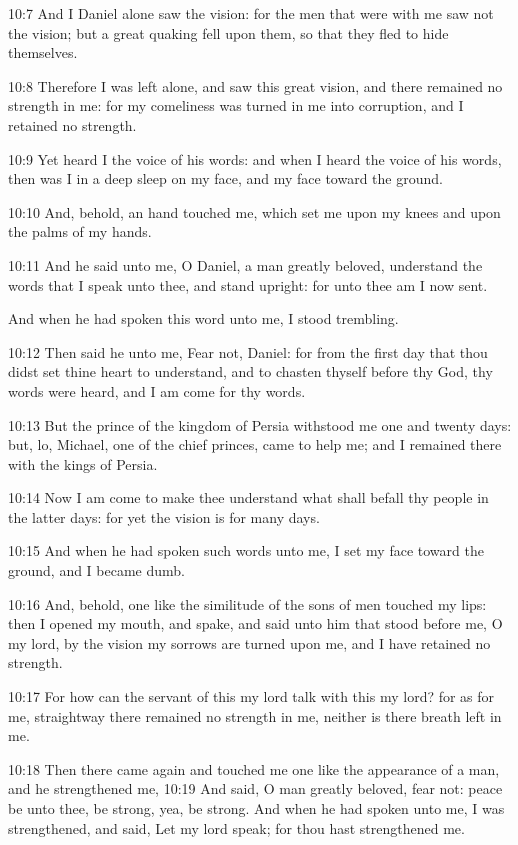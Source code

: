 10:7 And I Daniel alone saw the vision: for the men that were with me saw not the vision; but a great quaking fell upon them, so that they fled to hide themselves.

10:8 Therefore I was left alone, and saw this great vision, and there remained no strength in me: for my comeliness was turned in me into corruption, and I retained no strength.

10:9 Yet heard I the voice of his words: and when I heard the voice of his words, then was I in a deep sleep on my face, and my face toward the ground.

10:10 And, behold, an hand touched me, which set me upon my knees and upon the palms of my hands.

10:11 And he said unto me, O Daniel, a man greatly beloved, understand the words that I speak unto thee, and stand upright: for unto thee am I now sent.

And when he had spoken this word unto me, I stood trembling.

10:12 Then said he unto me, Fear not, Daniel: for from the first day that thou didst set thine heart to understand, and to chasten thyself before thy God, thy words were heard, and I am come for thy words.

10:13 But the prince of the kingdom of Persia withstood me one and twenty days: but, lo, Michael, one of the chief princes, came to help me; and I remained there with the kings of Persia.

10:14 Now I am come to make thee understand what shall befall thy people in the latter days: for yet the vision is for many days.

10:15 And when he had spoken such words unto me, I set my face toward the ground, and I became dumb.

10:16 And, behold, one like the similitude of the sons of men touched my lips: then I opened my mouth, and spake, and said unto him that stood before me, O my lord, by the vision my sorrows are turned upon me, and I have retained no strength.

10:17 For how can the servant of this my lord talk with this my lord?  for as for me, straightway there remained no strength in me, neither is there breath left in me.

10:18 Then there came again and touched me one like the appearance of a man, and he strengthened me, 10:19 And said, O man greatly beloved, fear not: peace be unto thee, be strong, yea, be strong. And when he had spoken unto me, I was strengthened, and said, Let my lord speak; for thou hast strengthened me.

